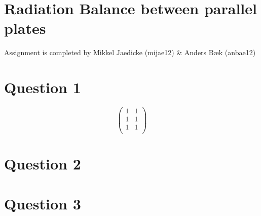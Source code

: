 \section*{Radiation Balance between parallel plates}
Assignment is completed by Mikkel Jaedicke (mijae12) \& Anders Bæk (anbae12)
\section*{Question 1}


\begin{equation}
\begin{pmatrix}  
1&  1\\  
1&  1\\  
1&1  \\
\end{pmatrix}
\label{eq:} 
\end{equation}


\section*{Question 2}
\section*{Question 3}

